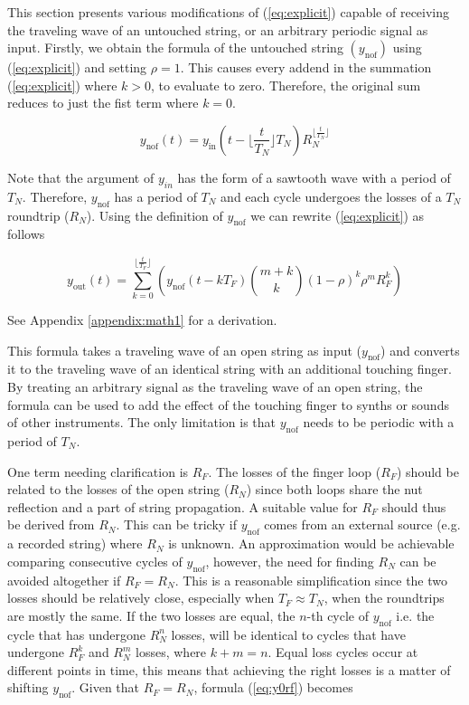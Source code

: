 \documentclass{sigchi}
\begin{document}
This section presents various modifications of (\ref{eq:explicit}) capable of receiving the traveling wave of an untouched string, or an arbitrary periodic signal as input.
Firstly, we obtain the formula of the untouched string $(y_{\textrm{nof}})$ using (\ref{eq:explicit}) and setting $\rho=1$. This causes every addend in the summation (\ref{eq:explicit}) where $k > 0$, to evaluate to zero. Therefore, the original sum reduces to just the fist term where $k = 0$.

\begin{equation}\label{eq:rho0}
	y_{\textrm{nof}}(t) = y_{\textrm{in}}(t-\lfloor\frac{t}{T_N}\rfloor T_N)R_N^{\lfloor\frac{t}{T_N}\rfloor}
\end{equation}

Note that the argument of $y_{in}$ has the form of a sawtooth wave with a period of $T_N$. Therefore, $y_{\textrm{nof}}$ has a period of $T_N$ and each cycle undergoes the losses of a $T_N$ roundtrip ($R_N$).
Using the definition of $y_{\textrm{nof}}$ we can rewrite (\ref{eq:explicit}) as follows

\begin{equation} \label{eq:y0rf}
	y_{\textrm{out}}(t) = \sum_{k=0}^{\lfloor \frac{t}{T_F} \rfloor}\left(y_{\textrm{nof}}(t - kT_F)\binom{m+k}{k} (1 - \rho)^{k} \rho^mR_F^k\right)
\end{equation}

See Appendix \ref{appendix:math1} for a derivation.

This formula takes a traveling wave of an open string as input ($y_{\textrm{nof}}$) and converts it to the traveling wave of an identical string with an additional touching finger. By treating an arbitrary signal as the traveling wave of an open string, the formula can be used to add the effect of the touching finger to synths or sounds of other instruments. The only limitation is that $y_{\textrm{nof}}$ needs to be periodic with a period of $T_N$.

One term needing clarification is $R_F$. The losses of the finger loop ($R_F$) should be related to the losses of the open string ($R_N$) since both loops share the nut reflection and a part of string propagation. A suitable value for $R_F$ should thus be derived from $R_N$. This can be tricky if $y_{\textrm{nof}}$ comes from an external source (e.g. a recorded string) where $R_N$ is unknown. An approximation would be achievable comparing consecutive cycles of $y_{\textrm{nof}}$, however, the need for finding $R_N$ can be avoided altogether if $R_F = R_N$. This is a reasonable simplification since the two losses should be relatively close, especially when $T_F \approx T_N$, when the roundtrips are mostly the same. If the two losses are equal, the $n$-th cycle of $y_{\textrm{nof}}$ i.e. the cycle that has undergone $R_N^n$ losses, will be identical to cycles that have undergone $R_F^k$ and $R_N^m$ losses, where $k+m=n$. Equal loss cycles occur at different points in time, this means that achieving the right losses is a matter of shifting $y_{\textrm{nof}}$. Given that $R_F = R_N$, formula (\ref{eq:y0rf}) becomes
\end{document}
